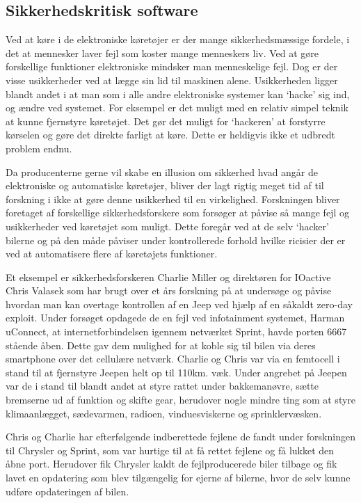 \subsection{Sikkerhedskritisk software}
Ved at køre i de elektroniske køretøjer er der mange sikkerhedsmæssige fordele, i det at mennesker laver fejl som koster mange menneskers liv. Ved at gøre forskellige funktioner elektroniske mindsker man menneskelige fejl. Dog er der visse usikkerheder ved at lægge sin lid til maskinen alene. Usikkerheden ligger blandt andet i at man som i alle andre elektroniske systemer kan `hacke' sig ind, og ændre ved systemet. For eksempel er det muligt med en relativ simpel teknik at kunne fjernstyre køretøjet. Det gør det muligt for `hackeren' at forstyrre kørselen og gøre det direkte farligt at køre. Dette er heldigvis ikke et udbredt problem endnu.  

Da producenterne gerne vil skabe en illusion om sikkerhed hvad angår de elektroniske og automatiske køretøjer, bliver der lagt rigtig meget tid af til forskning i ikke at gøre denne usikkerhed til en virkelighed. Forskningen bliver foretaget af forskellige sikkerhedsforskere som forsøger at påvise så mange fejl og usikkerheder ved køretøjet som muligt. Dette foregår ved at de selv `hacker' bilerne og på den måde påviser under kontrollerede forhold hvilke ricisier der er ved at automatisere flere af køretøjets funktioner.  


Et eksempel er sikkerhedsforskeren Charlie Miller og direktøren for IOactive Chris Valasek som har brugt over et års forskning på at undersøge og påvise hvordan man kan overtage kontrollen af en Jeep ved hjælp af en såkaldt zero-day exploit. Under forsøget opdagede de en fejl ved infotainment systemet, Harman uConnect, at internetforbindelsen igennem netværket Sprint, havde porten 6667 stående åben. Dette gav dem mulighed for at koble sig til bilen via deres smartphone over det cellulære netværk. Charlie og Chris var via en femtocell i stand til at fjernstyre Jeepen helt op til 110km. væk. Under angrebet på Jeepen var de i stand til blandt andet at styre rattet under bakkemanøvre, sætte bremserne ud af funktion og skifte gear, herudover nogle mindre ting som at styre klimaanlægget, sædevarmen, radioen, vinduesviskerne og sprinklervæsken.  

Chris og Charlie har efterfølgende indberettede fejlene de fandt under forskningen til Chrysler og Sprint, som var hurtige til at få rettet fejlene og få lukket den åbne port. Herudover fik Chrysler kaldt de fejlproducerede biler tilbage og fik lavet en opdatering som blev tilgængelig for ejerne af bilerne, hvor de selv kunne udføre opdateringen af bilen.   

